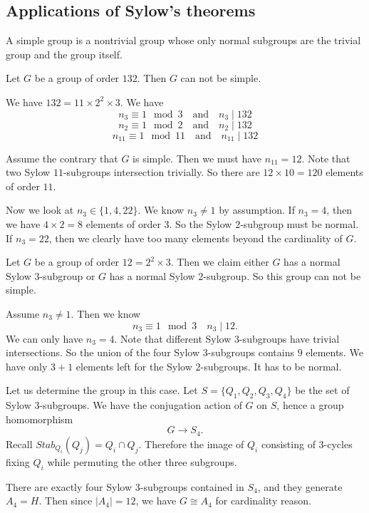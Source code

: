 \subsection{Applications of Sylow's theorems}

\begin{defi}
    A simple group is a nontrivial group whose only normal subgroups are the trivial group and the group itself.
\end{defi}

\begin{example}
    Let $G$ be a group of order $132$. Then $G$ can not be simple.

    We have $132 = 11 \times 2^2 \times 3$. We have
    \[
        n_3 \equiv 1 \mod 3 \quad \text{and} \quad  n_3 \mid 132
    \]
    \[
        n_2 \equiv 1 \mod 2 \quad \text{and} \quad  n_2 \mid 132
    \]
    \[
        n_{11} \equiv 1 \mod 11 \quad \text{and} \quad  n_{11} \mid 132
    \]

    Assume the contrary that $G$ is simple. Then we must have $n_{11} = 12$. Note that two Sylow $11$-subgroups intersection trivially.  So there are $12 \times 10 = 120$ elements of order $11$.

    Now we look at $n_3 \in \{1, 4, 22\}$. We know $n_3 \neq 1$ by assumption. If $n_3 = 4$, then we have $ 4 \times 2 =8$ elements of order $3$. So the Sylow $2$-subgroup must be normal. If $n_3 = 22$, then we clearly have too many elements beyond the cardinality of $G$.
\end{example}

\begin{example}
    Let $G$ be a group of order $12 = 2^2 \times 3$. Then we claim either $G$ has a normal Sylow $3$-subgroup or $G$ has a normal Sylow $2$-subgroup. So this group can not be simple.

    Assume $n_3 \neq 1$. Then we know
    \[
        n_3 \equiv 1 \mod 3 \quad n_3 \mid 12.
    \]
    We can only have $n_3 =4$. Note that different Sylow $3$-subgroups have trivial intersections. So the union of the four Sylow $3$-subgroups contains $9$ elements. We have only $3 + 1$ elements left for the Sylow $2$-subgroups. It has to be normal.




    Let us determine the group in this case. Let $S = \{Q_1, Q_2, Q_3, Q_4\}$ be the set of Sylow $3$-subgroups. We have the conjugation action of $G$ on $S$, hence a group homomorphism
    \[
        G \rightarrow S_4.
    \]
    Recall $Stab_{Q_i} (Q_j) = Q_i \cap Q_j$. Therefore the image of $Q_i$ consisting of 3-cycles fixing $Q_i$ while permuting the other three subgroups.

    There are exactly four Sylow $3$-subgroups contained in $S_4$, and they generate $A_4 = H$. Then since $|A_4| = 12$, we have $G \cong A_4$ for cardinality reason.
\end{example}

